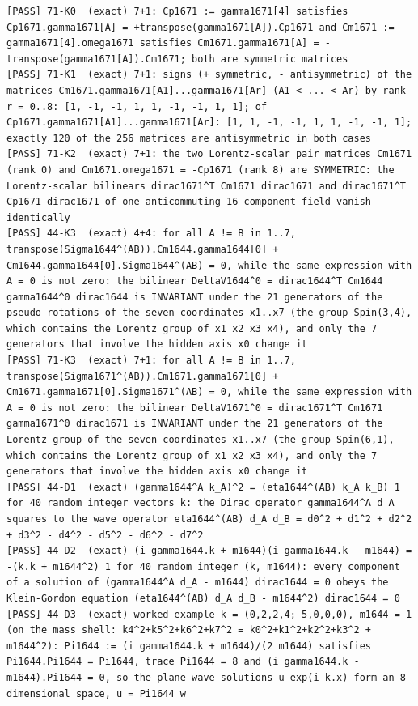 \documentclass[
  10pt,
]{article}
\begin{document}
\begin{verbatim}
[PASS] 71-K0  (exact) 7+1: Cp1671 := gamma1671[4] satisfies Cp1671.gamma1671[A] = +transpose(gamma1671[A]).Cp1671 and Cm1671 := gamma1671[4].omega1671 satisfies Cm1671.gamma1671[A] = -transpose(gamma1671[A]).Cm1671; both are symmetric matrices
[PASS] 71-K1  (exact) 7+1: signs (+ symmetric, - antisymmetric) of the matrices Cm1671.gamma1671[A1]...gamma1671[Ar] (A1 < ... < Ar) by rank r = 0..8: [1, -1, -1, 1, 1, -1, -1, 1, 1]; of Cp1671.gamma1671[A1]...gamma1671[Ar]: [1, 1, -1, -1, 1, 1, -1, -1, 1]; exactly 120 of the 256 matrices are antisymmetric in both cases
[PASS] 71-K2  (exact) 7+1: the two Lorentz-scalar pair matrices Cm1671 (rank 0) and Cm1671.omega1671 = -Cp1671 (rank 8) are SYMMETRIC: the Lorentz-scalar bilinears dirac1671^T Cm1671 dirac1671 and dirac1671^T Cp1671 dirac1671 of one anticommuting 16-component field vanish identically
[PASS] 44-K3  (exact) 4+4: for all A != B in 1..7, transpose(Sigma1644^(AB)).Cm1644.gamma1644[0] + Cm1644.gamma1644[0].Sigma1644^(AB) = 0, while the same expression with A = 0 is not zero: the bilinear DeltaV1644^0 = dirac1644^T Cm1644 gamma1644^0 dirac1644 is INVARIANT under the 21 generators of the pseudo-rotations of the seven coordinates x1..x7 (the group Spin(3,4), which contains the Lorentz group of x1 x2 x3 x4), and only the 7 generators that involve the hidden axis x0 change it
[PASS] 71-K3  (exact) 7+1: for all A != B in 1..7, transpose(Sigma1671^(AB)).Cm1671.gamma1671[0] + Cm1671.gamma1671[0].Sigma1671^(AB) = 0, while the same expression with A = 0 is not zero: the bilinear DeltaV1671^0 = dirac1671^T Cm1671 gamma1671^0 dirac1671 is INVARIANT under the 21 generators of the Lorentz group of the seven coordinates x1..x7 (the group Spin(6,1), which contains the Lorentz group of x1 x2 x3 x4), and only the 7 generators that involve the hidden axis x0 change it
[PASS] 44-D1  (exact) (gamma1644^A k_A)^2 = (eta1644^(AB) k_A k_B) 1 for 40 random integer vectors k: the Dirac operator gamma1644^A d_A squares to the wave operator eta1644^(AB) d_A d_B = d0^2 + d1^2 + d2^2 + d3^2 - d4^2 - d5^2 - d6^2 - d7^2
[PASS] 44-D2  (exact) (i gamma1644.k + m1644)(i gamma1644.k - m1644) = -(k.k + m1644^2) 1 for 40 random integer (k, m1644): every component of a solution of (gamma1644^A d_A - m1644) dirac1644 = 0 obeys the Klein-Gordon equation (eta1644^(AB) d_A d_B - m1644^2) dirac1644 = 0
[PASS] 44-D3  (exact) worked example k = (0,2,2,4; 5,0,0,0), m1644 = 1 (on the mass shell: k4^2+k5^2+k6^2+k7^2 = k0^2+k1^2+k2^2+k3^2 + m1644^2): Pi1644 := (i gamma1644.k + m1644)/(2 m1644) satisfies Pi1644.Pi1644 = Pi1644, trace Pi1644 = 8 and (i gamma1644.k - m1644).Pi1644 = 0, so the plane-wave solutions u exp(i k.x) form an 8-dimensional space, u = Pi1644 w

\end{verbatim}
\end{document}
